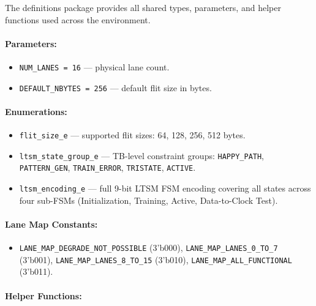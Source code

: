 \documentclass[11pt,a4paper]{article}
\begin{document}
The definitions package provides all shared types, parameters, and helper functions used across the environment.

\paragraph{Parameters:}

\begin{itemize}
  \item \texttt{NUM\_LANES = 16} --- physical lane count.
  \item \texttt{DEFAULT\_NBYTES = 256} --- default flit size in bytes.
\end{itemize}


\paragraph{Enumerations:}

\begin{itemize}
  \item \texttt{flit\_size\_e} --- supported flit sizes: 64, 128, 256, 512 bytes.
  \item \texttt{ltsm\_state\_group\_e} --- TB-level constraint groups: \texttt{HAPPY\_PATH}, \texttt{PATTERN\_GEN}, \texttt{TRAIN\_ERROR}, \texttt{TRISTATE}, \texttt{ACTIVE}.
  \item \texttt{ltsm\_encoding\_e} --- full 9-bit LTSM FSM encoding covering all states across four sub-FSMs (Initialization, Training, Active, Data-to-Clock Test).
\end{itemize}


\paragraph{Lane Map Constants:}

\begin{itemize}
  \item \texttt{LANE\_MAP\_DEGRADE\_NOT\_POSSIBLE} (3'b000), \texttt{LANE\_MAP\_LANES\_0\_TO\_7} (3'b001), \texttt{LANE\_MAP\_LANES\_8\_TO\_15} (3'b010), \texttt{LANE\_MAP\_ALL\_FUNCTIONAL} (3'b011).
\end{itemize}


\paragraph{Helper Functions:}
\end{document}
